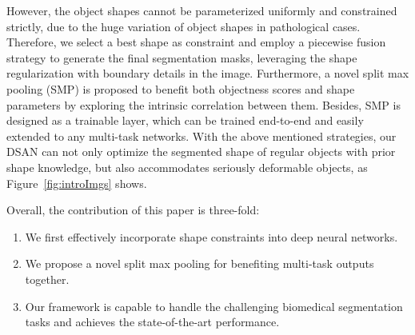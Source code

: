 However, the object shapes cannot be parameterized uniformly and constrained strictly, due to the huge variation of object shapes in pathological cases.
%
Therefore, we select a best shape as constraint and employ a piecewise fusion strategy to generate the final segmentation masks, leveraging the shape regularization with boundary details in the image.
Furthermore, a novel split max pooling (SMP) is proposed to benefit both objectness scores and shape parameters by exploring the intrinsic correlation between them.
Besides, SMP is designed as a trainable layer, which can be trained end-to-end and easily extended to any multi-task networks.
With the above mentioned strategies, our DSAN can not only optimize the segmented shape of regular objects with prior shape knowledge, but also accommodates seriously deformable objects, as Figure~\ref{fig:introImgs} shows.

Overall, the contribution of this paper is three-fold:
\begin{enumerate}
	\item We first effectively incorporate shape constraints into deep neural networks. 
	\item We propose a novel split max pooling for benefiting multi-task outputs together.
	\item Our framework is capable to handle the challenging biomedical segmentation tasks and achieves the state-of-the-art performance.
\end{enumerate}
